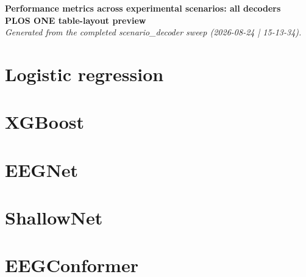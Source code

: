 \documentclass[10pt,letterpaper]{article}
\newcommand{\previewtable}[2]{%
  \clearpage
  \section*{#1}%
  \begingroup
  \renewcommand{\label}[1]{}%
  \endgroup
}
\begin{document}
\vspace*{0.2in}
\begin{flushleft}
{\Large\textbf{Performance metrics across experimental scenarios: all decoders}}\\
\vspace{0.15in}
\textbf{PLOS ONE table-layout preview}\\
\textit{Generated from the completed scenario\_decoder sweep (2026-08-24 | 15-13-34).}
\end{flushleft}

\previewtable{Logistic regression}{scenario_table_logistic_regression.tex}
\previewtable{XGBoost}{scenario_table_xgboost.tex}
\previewtable{EEGNet}{scenario_table_eegnet.tex}
\previewtable{ShallowNet}{scenario_table_shallownet.tex}
\previewtable{EEGConformer}{scenario_table_eegconformer.tex}
\end{document}
